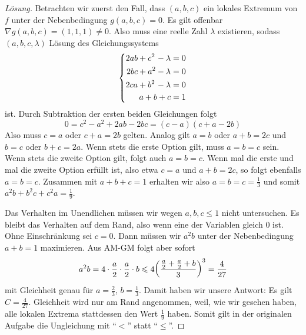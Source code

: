 \begin{proof}[Lösung]
	Betrachten wir zuerst den Fall, dass $(a,b,c)$ ein lokales Extremum von $f$ unter der Nebenbedingung $g(a,b,c)=0$. Es gilt offenbar $\nabla g(a,b,c)=(1,1,1)\neq 0$.  Also muss eine reelle Zahl $\lambda$ existieren, sodass $(a,b,c,\lambda)$ Lösung des Gleichungssystems
	\begin{equation*}
		\left\{\begin{alignedat}{3}
			2ab&+c^2&&-\lambda&&=0\\
			2bc&+a^2&&-\lambda&&=0\\
			2ca&+b^2&&-\lambda&&=0\\
			&&&&\llap{$a+b+c$}&=1
		\end{alignedat}\right.
	\end{equation*}
	ist. Durch Subtraktion der ersten beiden Gleichungen folgt
	\begin{equation*}
		0=c^2-a^2+2ab-2bc=(c-a)(c+a-2b)
	\end{equation*}
	Also muss $c=a$ oder $c+a=2b$ gelten. Analog gilt $a=b$ oder $a+b=2c$ und $b=c$ oder $b+c=2a$. Wenn stets die erste Option gilt, muss $a=b=c$ sein. Wenn stets die zweite Option gilt, folgt auch $a=b=c$. Wenn mal die erste und mal die zweite Option erfüllt ist, also etwa $c=a$ und $a+b=2c$, so folgt ebenfalls $a=b=c$. Zusammen mit $a+b+c=1$ erhalten wir also $a=b=c=\frac13$ und somit $a^2b+b^2c+c^2a=\frac19$.
	
	Das Verhalten im Unendlichen müssen wir wegen $a,b,c\leqslant 1$ nicht untersuchen. Es bleibt das Verhalten auf dem Rand, also wenn eine der Variablen gleich $0$ ist. Ohne Einschränkung sei $c=0$. Dann müssen wir $a^2b$ unter der Nebenbedingung $a+b=1$ maximieren. Aus AM-GM folgt aber sofort
	\begin{equation*}
		a^2b=4\cdot\frac{a}{2}\cdot \frac{a}{2}\cdot b\leqslant 4\parens*{\frac{\frac a2+\frac a2+b}{3}}^3=\frac{4}{27}
	\end{equation*}
	mit Gleichheit genau für $a=\frac23$, $b=\frac13$. Damit haben wir unsere Antwort: Es gilt $C=\frac{4}{27}$. Gleichheit wird nur am Rand angenommen, weil, wie wir gesehen haben, alle lokalen Extrema stattdessen den Wert $\frac19$ haben. Somit gilt in der originalen Aufgabe die Ungleichung mit \enquote{$<$} statt \enquote{$\leqslant$}.
\end{proof}

